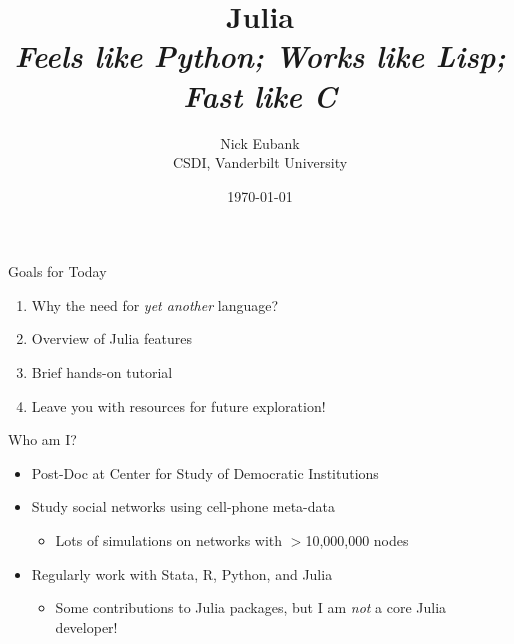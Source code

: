 \documentclass[11pt]{beamer}
\title{Julia \\ \emph{Feels like Python; Works like Lisp; Fast like C}}
\author{	\small Nick Eubank \\
			\scriptsize{CSDI, Vanderbilt University}\vspace*{.15in} \\}
\date{\vspace*{.3in} \today}
\begin{document}
\begin{frame}
	\maketitle
\end{frame}

\begin{frame}[c]{Goals for Today}
    \begin{enumerate}
        \item Why the need for \emph{yet another} language?
        \item Overview of Julia features
        \item Brief hands-on tutorial
        \item Leave you with resources for future exploration!
    \end{enumerate}
\end{frame}

\begin{frame}[c]{Who am I?}
\begin{itemize}
    \item Post-Doc at Center for Study of Democratic Institutions
    \item Study social networks using cell-phone meta-data
    \begin{itemize}
        \item Lots of simulations on networks with $>$10,000,000 nodes
    \end{itemize}
    \item Regularly work with Stata, R, Python, and Julia
    \begin{itemize}
        \item Some contributions to Julia packages, but I am \emph{not} a core Julia developer!
    \end{itemize}
\end{itemize}
\end{frame}
\end{document}

